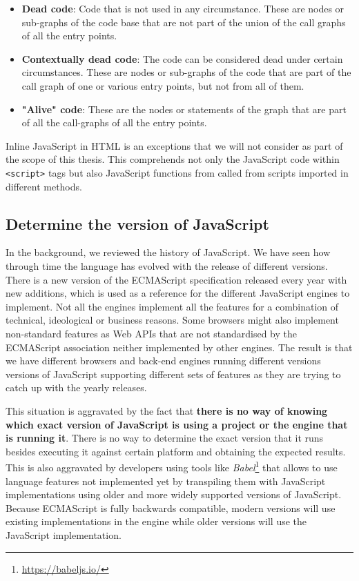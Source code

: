 \documentclass{uvamscse}
\begin{document}
\begin{itemize}
    \item \textbf{Dead code}: Code that is not used in any circumstance. These are nodes or sub-graphs of the code base that are not part of the union of the call graphs of all the entry points. 
    \item \textbf{Contextually dead code}: The code can be considered dead under certain circumstances. These are nodes or sub-graphs of the code that are part of the call graph of one or various entry points, but not from all of them. 
    \item \textbf{"Alive" code}: These are the nodes or statements of the graph that are part of all the call-graphs of all the entry points.
\end{itemize}

Inline JavaScript in HTML is an exceptions that we will not consider as part of the scope of this thesis. This comprehends not only the JavaScript code within \texttt{<script>} tags but also JavaScript functions from called from scripts imported in different methods.

\subsection{Determine the version of JavaScript}
In the background, we reviewed the history of JavaScript. We have seen how through time the language has evolved with the release of different versions. There is a new version of the ECMAScript specification released every year \cite{ECMAReleases} with new additions, which is used as a reference for the different JavaScript engines to implement. Not all the engines implement all the features for a combination of technical, ideological or business reasons. Some browsers might also implement non-standard features as Web APIs that are not standardised by the ECMAScript association neither implemented by other engines. The result is that we have different browsers and back-end engines running different versions versions of JavaScript supporting different sets of features as they are trying to catch up with the yearly releases.

This situation is aggravated by the fact that \textbf{there is no way of knowing which exact version of JavaScript is using a project or the engine that is running it}. There is no way to determine the exact version that it runs besides executing it against certain platform and obtaining the expected results. This is also aggravated by developers using tools like \textit{Babel}\footnote{\url{https://babeljs.io/}} that allows to use language features not implemented yet by transpiling them with JavaScript implementations using older and more widely supported versions of JavaScript. Because ECMAScript is fully backwards compatible, modern versions will use existing implementations in the engine while older versions will use the JavaScript implementation. 
\end{document}
